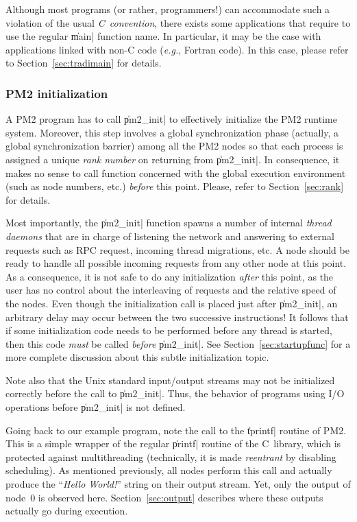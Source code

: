 Although most programs (or rather, programmers!) can accommodate such a
violation of the usual \emph{C~convention}, there exists some
applications that require to use the regular \|main| function name. In
particular, it may be the case with applications linked with non-C
code (\emph{e.g.}, Fortran code).  In this case, please refer to
Section~\ref{sec:tradimain} for details.

\subsubsection{PM2 initialization}

A PM2 program has to call \|pm2_init| to effectively initialize the
PM2 runtime system. Moreover, this step involves a global
synchronization phase (actually, a global synchronization barrier)
among all the PM2 nodes so that each process is assigned a unique
\emph{rank number} on returning from \|pm2_init|. In consequence, it
makes no sense to call function concerned with the global execution
environment (such as node numbers, etc.)  \emph{before} this point.
Please, refer to Section~\ref{sec:rank} for details.

Most importantly, the \|pm2_init| function spawns a number of internal
\emph{thread daemons} that are in charge of listening the network and
answering to external requests such as RPC request, incoming thread
migrations, etc. A node should be ready to handle all possible
incoming requests from any other node at this point. As a consequence,
it is not safe to do any initialization \emph{after} this point, as
the user has no control about the interleaving of requests and the
relative speed of the nodes. Even though the initialization call is
placed just after \|pm2_init|, an arbitrary delay may occur between
the two successive instructions! It follows that if some
initialization code needs to be performed before any thread is
started, then this code \emph{must} be called \emph{before}
\|pm2_init|.  See Section~\ref{sec:startupfunc} for a more complete
discussion about this subtle initialization topic.

Note also that the Unix standard input/output streams may not be
initialized correctly before the call to \|pm2_init|. Thus, the
behavior of programs using I/O operations before \|pm2_init| is not
defined.

Going back to our example program, note the call to the \|tprintf|
routine of PM2. This is a simple wrapper of the regular \|printf|
routine of the C~library, which is protected against multithreading
(technically, it is made \emph{reentrant} by disabling scheduling).
As mentioned previously, all nodes perform this call and actually
produce the ``\emph{Hello World!}'' string on their output stream.
Yet, only the output of node~0 is observed here.
Section~\ref{sec:output} describes where these outputs actually go
during execution.

